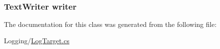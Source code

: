 \subsubsection[{writer}]{\setlength{\rightskip}{0pt plus 5cm}Text\+Writer writer\hspace{0.3cm}{\ttfamily [protected]}}\label{classOTA_1_1Logging_1_1InteractiveLogTarget_a7ccedb45f8fd2e6cf4f6d7d8c095e835}


The documentation for this class was generated from the following file\+:\begin{DoxyCompactItemize}
\item 
Logging/\hyperlink{LogTarget_8cs}{Log\+Target.\+cs}\end{DoxyCompactItemize}
